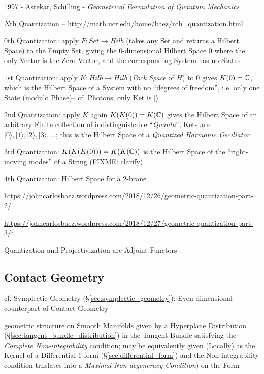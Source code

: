 1997 - Astekar, Schilling - \emph{Geometrical Formulation of Quantum Mechanics}

$N$th Quantization -- \url{http://math.ucr.edu/home/baez/nth_quantization.html}

$0$th Quantization: apply $F : Set \rightarrow Hilb$ (takes any Set and returns
a Hilbert Space) to the Empty Set, giving the $0$-dimensional Hilbert Space
$\xspace{0}$ where the only Vector is the Zero Vector, and the corresponding
System has no States

$1$st Quantization: apply $K : Hilb \rightarrow Hilb$ (\emph{Fock Space} of $H$)
to $\xspace{0}$ gives $K({0}) = \mathbb{C}$, which is the Hilbert Space of a
System with no ``degrees of freedom'', i.e. only one State (modulo Phase)-- cf.
Photons; only Ket is $|\rangle$

$2$nd Quantization: apply $K$ again $K(K({0})) = K(\mathbb{C})$ gives the
Hilbert Space of an arbitrary Finite collection of indistinguishable
``\emph{Quanta}''; Kets are $|0\rangle, |1\rangle, |2\rangle, |3\rangle,
\ldots$; this is the Hilbert Space of a \emph{Quantized Harmonic Oscillator}

$3$rd Quantization: $K(K(K({0}))) = K(K(\mathbb{C}))$ is the Hilbert Space of
the ``right-moving modes'' of a String (FIXME: clarify)

$4$th Quantization: Hilbert Space for a $2$-brane

\url{https://johncarlosbaez.wordpress.com/2018/12/26/geometric-quantization-part-2/}

\url{https://johncarlosbaez.wordpress.com/2018/12/27/geometric-quantization-part-3/}:

Quantization and Projectivization are Adjoint Functors



\subsection{Contact Geometry}\label{sec:contact_geometry}

\fist cf. Symplectic Geometry (\S\ref{sec:symplectic_geometry}):
Even-dimensional counterpart of Contact Geometry

geometric structure on Smooth Manifolds given by a Hyperplane Distribution
(\S\ref{sec:tangent_bundle_distribution}) in the Tangent Bundle satisfying the
\emph{Complete Non-integrability} condition; may be equivalently given
(Locally) as the Kernel of a Differential $1$-form
(\S\ref{sec:differential_form}) and the Non-integrability condition trnslates
into a \emph{Maximal Non-degeneracy Condition}) on the Form

